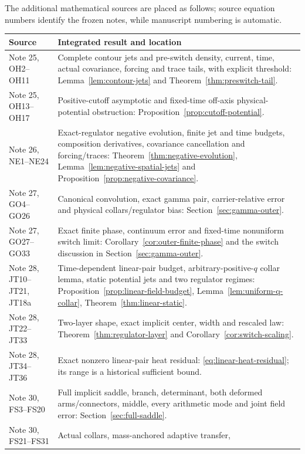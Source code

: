 The additional mathematical sources are placed as follows; source equation
numbers identify the frozen notes, while manuscript numbering is automatic.
\begingroup\small
\begin{longtable}{@{}>{\raggedright\arraybackslash}p{}>{\raggedright\arraybackslash}p{}@{}}
\toprule Source & Integrated result and location\\\midrule\endhead
Note 25, OH2--OH11 & Complete contour jets and pre-switch density,
current, time, actual covariance, forcing and trace tails, with explicit
threshold: Lemma~\ref{lem:contour-jets} and Theorem~\ref{thm:preswitch-tail}.\\
Note 25, OH13--OH17 & Positive-cutoff asymptotic and fixed-time off-axis
physical-potential obstruction: Proposition~\ref{prop:cutoff-potential}.\\
Note 26, NE1--NE24 & Exact-regulator negative evolution, finite jet and
time budgets, composition derivatives, covariance cancellation and
forcing/traces: Theorem~\ref{thm:negative-evolution},
Lemma~\ref{lem:negative-spatial-jets} and
Proposition~\ref{prop:negative-covariance}.\\
Note 27, GO4--GO26 & Canonical convolution, exact gamma pair,
carrier-relative error and physical collars/regulator bias:
Section~\ref{sec:gamma-outer}.\\
Note 27, GO27--GO33 & Exact finite phase, continuum error and fixed-time
nonuniform switch limit: Corollary~\ref{cor:outer-finite-phase} and the
switch discussion in Section~\ref{sec:gamma-outer}.\\
Note 28, JT10--JT21, JT18a & Time-dependent linear-pair budget,
arbitrary-positive-$q$ collar lemma, static potential jets and two
regulator regimes: Proposition~\ref{prop:linear-field-budget},
Lemma~\ref{lem:uniform-q-collar}, Theorem~\ref{thm:linear-static}.\\
Note 28, JT22--JT33 & Two-layer shape, exact implicit center, width and
rescaled law: Theorem~\ref{thm:regulator-layer} and
Corollary~\ref{cor:switch-scaling}.\\
Note 28, JT34--JT36 & Exact nonzero linear-pair heat residual:
\eqref{eq:linear-heat-residual}; its range is a historical sufficient bound.\\
Note 30, FS3--FS20 & Full implicit saddle, branch, determinant, both
deformed arms/connectors, middle, every arithmetic mode and joint field
error: Section~\ref{sec:full-saddle}.\\
Note 30, FS21--FS31 & Actual collars, mass-anchored adaptive transfer,

\end{longtable}
